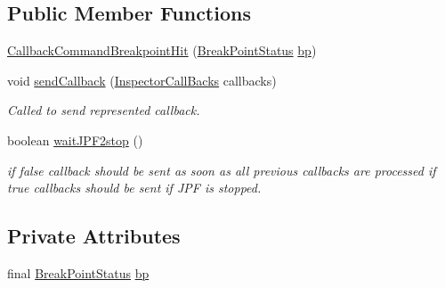 \subsection*{Public Member Functions}
\begin{DoxyCompactItemize}
\item 
\hyperlink{classgov_1_1nasa_1_1jpf_1_1inspector_1_1server_1_1callbacks_1_1commands_1_1_callback_command_breakpoint_hit_a89fc190484dbc0cb981185d3316c5ae0}{Callback\+Command\+Breakpoint\+Hit} (\hyperlink{interfacegov_1_1nasa_1_1jpf_1_1inspector_1_1interfaces_1_1_break_point_status}{Break\+Point\+Status} \hyperlink{classgov_1_1nasa_1_1jpf_1_1inspector_1_1server_1_1callbacks_1_1commands_1_1_callback_command_breakpoint_hit_a6b772099d622f8f14ee067c7d7ce46ce}{bp})
\item 
void \hyperlink{classgov_1_1nasa_1_1jpf_1_1inspector_1_1server_1_1callbacks_1_1commands_1_1_callback_command_breakpoint_hit_aeecbb0871ffec48a3e0f2c70ab15d529}{send\+Callback} (\hyperlink{interfacegov_1_1nasa_1_1jpf_1_1inspector_1_1interfaces_1_1_inspector_call_backs}{Inspector\+Call\+Backs} callbacks)
\begin{DoxyCompactList}\small\item\em Called to send represented callback. \end{DoxyCompactList}\item 
boolean \hyperlink{classgov_1_1nasa_1_1jpf_1_1inspector_1_1server_1_1callbacks_1_1commands_1_1_callback_command_breakpoint_hit_a29df60af9ac0b70c256fd4e6274b8bf0}{wait\+J\+P\+F2stop} ()
\begin{DoxyCompactList}\small\item\em if false callback should be sent as soon as all previous callbacks are processed if true callbacks should be sent if J\+PF is stopped. \end{DoxyCompactList}\end{DoxyCompactItemize}
\subsection*{Private Attributes}
\begin{DoxyCompactItemize}
\item 
final \hyperlink{interfacegov_1_1nasa_1_1jpf_1_1inspector_1_1interfaces_1_1_break_point_status}{Break\+Point\+Status} \hyperlink{classgov_1_1nasa_1_1jpf_1_1inspector_1_1server_1_1callbacks_1_1commands_1_1_callback_command_breakpoint_hit_a6b772099d622f8f14ee067c7d7ce46ce}{bp}
\end{DoxyCompactItemize}


